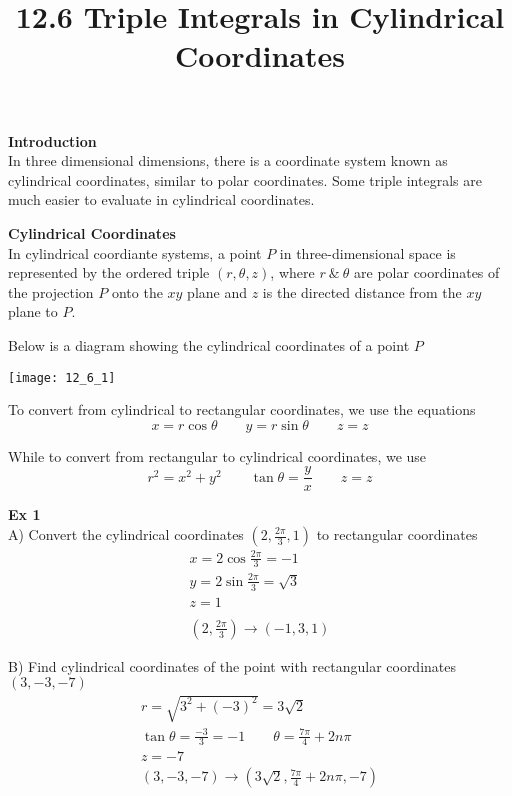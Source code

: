 \documentclass{article}
\title{12.6 Triple Integrals in Cylindrical Coordinates}
\begin{document}
  \maketitle
  \textbf{Introduction}\\
  In three dimensional dimensions, there is a coordinate system known as cylindrical coordinates, similar to polar coordinates. Some triple integrals are much easier to evaluate in cylindrical coordinates.

  \textbf{Cylindrical Coordinates}\\
  In cylindrical coordiante systems, a point $ P $ in three-dimensional space is represented by the ordered triple $ (r,\theta, z) $, where $ r ~\&~ \theta $ are polar coordinates of the projection $ P $ onto the $ xy $ plane and $ z $ is the directed distance from the $ xy $ plane to $ P $.

  Below is a diagram showing the cylindrical coordinates of a point $ P $ 

  \begin{center}
    \texttt{[image: 12\_6\_1]}
  \end{center}

  To convert from cylindrical to rectangular coordinates, we use the equations
  \[
    x=r\cos{\theta} \qquad y=r\sin{\theta} \qquad z=z
  \]
  
  While to convert from rectangular to cylindrical coordinates, we use
  \[
    r^{2}=x^{2}+y^{2} \qquad \tan{\theta}=\frac{y}{x} \qquad z=z
  \]

  \textbf{Ex 1}\\
  A) Convert the cylindrical coordinates $ (2,\frac{2\pi}{3},1) $ to rectangular coordinates
  \[
    \begin{gathered}
    x=2\cos{\frac{2\pi}{3}}=-1\\
    y=2\sin{\frac{2\pi}{3}}=\sqrt{3}\\
    z=1\\
    ~\\
    \boxed{(2,\frac{2\pi}{3}) \to (-1,3,1)} 
    \end{gathered}
  \]

  B) Find cylindrical coordinates of the point with rectangular coordinates $ (3,-3,-7) $
  \[
    \begin{gathered}
    r=\sqrt{3^{2}+(-3)^{2}}=3\sqrt{2}\\
    \tan{\theta}=\frac{-3}{3}=-1 \qquad \theta=\frac{7\pi}{4}+2n\pi\\
    z=-7\\
    \boxed{(3,-3,-7) \to (3\sqrt{2},\frac{7\pi}{4}+2n\pi,-7)}
    \end{gathered}
  \]
\end{document}
